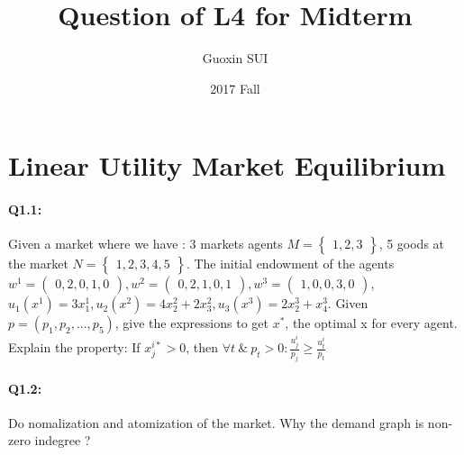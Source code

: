 \documentclass{article}
\title{Question of L4 for Midterm}
\author{Guoxin SUI}
\date{2017 Fall}
\begin{document}
\maketitle

\section{Linear Utility Market Equilibrium}
\paragraph{Q1.1:}
Given a market where we have :
$3$ markets agents $ M = \begin{Bmatrix} 1,2,3 \end{Bmatrix}$,
5 goods at the market $ N = \begin{Bmatrix} 1,2,3,4,5 \end{Bmatrix}$.
The initial endowment of the agents
$ w^1 = \begin{pmatrix} 0, 2, 0, 1, 0 \end{pmatrix},
w^2 = \begin{pmatrix} 0, 2, 1, 0, 1 \end{pmatrix},
w^3 = \begin{pmatrix} 1, 0, 0, 3, 0 \end{pmatrix}$,
$u_1(x^1) = 3x_1^1, u_2(x^2) = 4x_2^2 + 2x_3^2, u_3(x^3) = 2x_2^3 + x_4^3$.
Given $p = (p_1,p_2,...,p_5)$, give the expressions to get $x^*$, the optimal x for every agent.
Explain the property: If $x_j^{i*} >0$, then $\forall t \ \&  \ p_t > 0: \frac{u_j^i}{p_j} \ge \frac{u_t^i}{p_t}$
\paragraph{Q1.2:}
Do nomalization and atomization of the market. Why the demand graph is non-zero indegree ?
\end{document}
